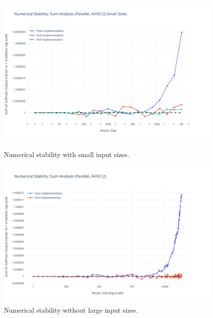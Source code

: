 \documentclass[10pt]{report}
\begin{document}
\begin{figure}[H]
  \centering
  \begin{minipage}{0.49\textwidth}
    \centering
    \includegraphics[width=\textwidth]{../images/stability/stability_parallel_avx512_1M.pdf}
    \caption{Numerical stability with small input sizes.}
    \label{fig:stability_1M}
  \end{minipage}
  \hfill
  \begin{minipage}{0.49\textwidth}
    \centering
    \includegraphics[width=\textwidth]{../images/stability/stability_parallel_avx512_1B.pdf}
    \caption{Numerical stability without large input sizes.}
    \label{fig:stability_1B}
  \end{minipage}
\end{figure}
\end{document}
